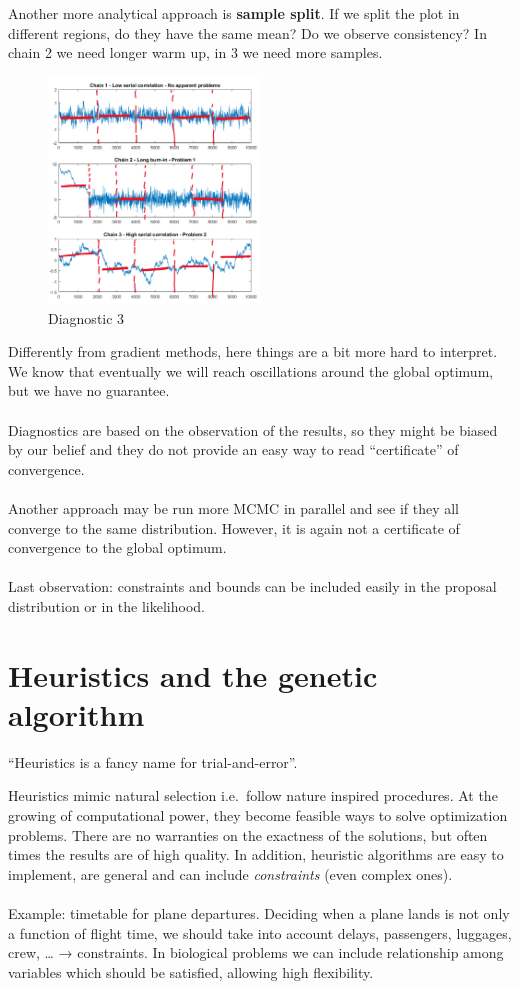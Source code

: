 \noindent
Another more analytical approach is \textbf{sample split}. If we split
the plot in different regions, do they have the same mean? Do we observe
consistency? In chain 2 we need longer warm up, in 3 we need more
samples.

\begin{figure}
\centering
\includegraphics[width=0.5\textwidth]{diag_3.png}
\caption{Diagnostic 3}
\end{figure}
\noindent
Differently from gradient methods, here things are a bit more hard to
interpret. We know that eventually we will reach oscillations around the
global optimum, but we have no guarantee.
\\
\\
\noindent
Diagnostics are based on the observation of the results, so they might
be biased by our belief and they do not provide an easy way to read
``certificate'' of convergence.
\\
\\
\noindent
Another approach may be run more MCMC in parallel and see if they all
converge to the same distribution. However, it is again not a
certificate of convergence to the global optimum.
\\
\\
\noindent
Last observation: constraints and bounds can be included easily in the
proposal distribution or in the likelihood.

\section{Heuristics and the genetic algorithm}

``Heuristics is a fancy name for trial-and-error''.

Heuristics mimic natural selection i.e.~follow nature inspired
procedures. At the growing of computational power, they become feasible
ways to solve optimization problems. There are no warranties on the
exactness of the solutions, but often times the results are of high
quality. In addition, heuristic algorithms are easy to implement, are
general and can include \emph{constraints} (even complex ones).
\\
\\
\noindent
Example: timetable for plane departures. Deciding when a plane lands is
not only a function of flight time, we should take into account delays,
passengers, luggages, crew, \ldots{} → constraints. In biological
problems we can include relationship among variables which should be
satisfied, allowing high flexibility.

